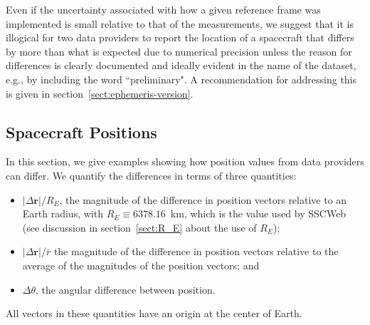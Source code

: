 \documentclass[draft]{agujournal2019}
\begin{document}
Even if the uncertainty associated with how a given reference frame was implemented is small relative to that of the measurements, we suggest that it is illogical for two data providers to report the location of a spacecraft that differs by more than what is expected due to numerical precision unless the reason for differences is clearly documented and ideally evident in the name of the dataset, e.g., by including the word ``preliminary". A recommendation for addressing this is given in section~\ref{sect:ephemeris-version}.


\subsection{Spacecraft Positions}
\label{sect:comparisons_ephemeris}

In this section, we give examples showing how position values from data providers can differ. We quantify the differences in terms of three quantities: 

\begin{itemize}
    \item $|\Delta\mathbf{r}|/R_E$, the magnitude of the difference in position vectors relative to an Earth radius, with $R_E\equiv 6378.16$~km, which is the value used by SSCWeb (see discussion in section~\ref{sect:R_E} about the use of $R_E$);
    \item $|\Delta\mathbf{r}|/\overline{r}$ the magnitude of the difference in position vectors relative to the average of the magnitudes of the position vectors; and
    \item  $\Delta \theta$, the angular difference between position.
\end{itemize}

All vectors in these quantities have an origin at the center of Earth. 
\end{document}
